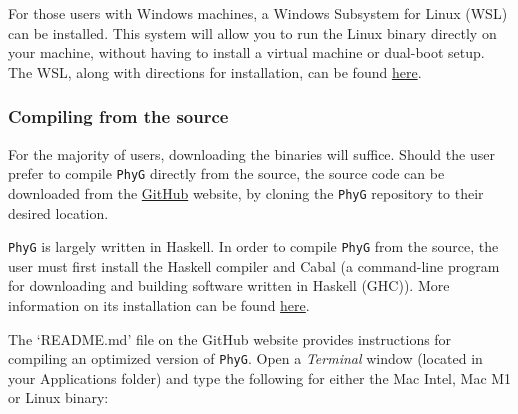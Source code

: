 \documentclass[11pt]{book}
\newcommand{\phyg}{\texttt{PhyG} }
\begin{document}
{{		For those users with Windows machines, a Windows Subsystem for Linux 
		(WSL) can be installed. This system will allow you to run the Linux binary directly 
		on your machine, without having to install a virtual machine or dual-boot setup. 
		The WSL, along with directions for installation, can be found 
		\href{https://learn.microsoft.com/en-us/windows/wsl/}{here}.
		
	\subsubsection{Compiling from the source}
		
		For the majority of users, downloading the binaries will suffice. Should the user prefer to 
		compile \phyg directly from the source, the source code can be downloaded 
		from the \href{https://github.com/amnh/PhyGraph}{GitHub} website, by cloning
		the \phyg repository to their desired location. 
		
		\phyg is largely 	written in Haskell. In order to compile \phyg from the source, the user 
		must first install the Haskell compiler and Cabal (a command-line program for downloading 
		and building software written in Haskell (GHC)). More information on its installation can be 
		found  \href{https://www.schoolofhaskell.com/user/simonmichael/how-to-cabal-install}{here}.
		
		The `README.md' file on the GitHub website provides instructions for compiling an 
		optimized version of \texttt{PhyG}. Open a \textit{Terminal} window (located in your 
		Applications folder) and type the following for 
		either the Mac Intel, Mac M1 or Linux binary:

		
%		
%		
%		
%		
		
}}
\end{document}
